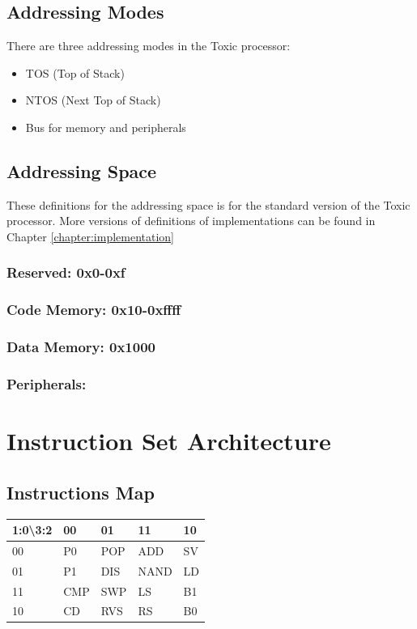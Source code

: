 \documentclass[11pt]{book}
\begin{document}
    \section{Addressing Modes}
    There are three addressing modes in the Toxic processor:
    \begin{itemize}
        \item TOS (Top of Stack)
        \item NTOS (Next Top of Stack)
        \item Bus for memory and peripherals
    \end{itemize}

    \section{Addressing Space}
    These definitions for the addressing space is for the standard version of the Toxic processor.
    More versions of definitions of implementations can be found in Chapter \ref{chapter:implementation}
    \label{section:addressingspace}
    \subsection{Reserved: 0x0-0xf}
    \subsection{Code Memory: 0x10-0xffff}
    \subsection{Data Memory: 0x1000}
    \subsection{Peripherals:}




    \chapter{Instruction Set Architecture}
    \section{Instructions Map}
    \begin{table}[h]
        \begin{tabular}{|l|l|l|l|l|}
        \hline
        1:0\textbackslash{}3:2 & 00  & 01  & 11   & 10 \\ \hline
        00                     & P0  & POP & ADD  & SV \\ \hline
        01                     & P1  & DIS & NAND & LD \\ \hline
        11                     & CMP & SWP & LS   & B1 \\ \hline
        10                     & CD  & RVS & RS   & B0 \\ \hline
        \end{tabular}
    \end{table}
\end{document}

